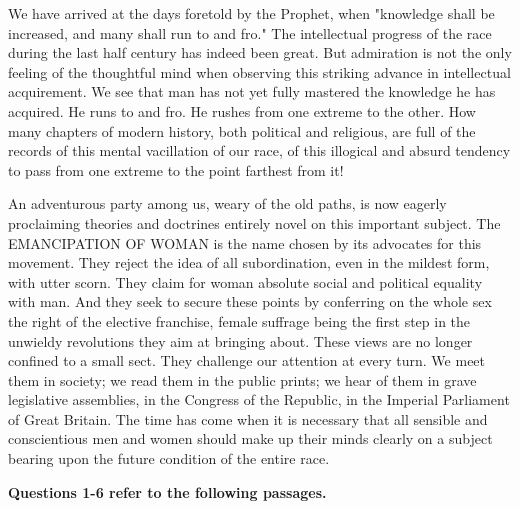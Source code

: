 \begin{linenumbers}
\indent We have arrived at the days foretold by the Prophet, when "knowledge shall be increased, and many shall run to and fro." The intellectual progress of the race during the last half century has indeed been great. But admiration is not the only feeling of the thoughtful mind when observing this striking advance in intellectual acquirement. We see that man has not yet fully mastered the knowledge he has acquired. He runs to and fro. He rushes from one extreme to the other. How many chapters of modern history, both political and religious, are full of the records of this mental vacillation of our race, of this illogical and absurd tendency to pass from one extreme to the point farthest from it!

\indent An adventurous party among us, weary of the old paths, is now eagerly proclaiming theories and doctrines entirely novel on this important subject. The EMANCIPATION OF WOMAN is the name chosen by its advocates for this movement. They reject the idea of all subordination, even in the mildest form, with utter scorn. They claim for woman absolute social and political equality with man. And they seek to secure these points by conferring on the whole sex the right of the elective franchise, female suffrage being the first step in the unwieldy revolutions they aim at bringing about. These views are no longer confined to a small sect. They challenge our attention at every turn. We meet them in society; we read them in the public prints; we hear of them in grave legislative assemblies, in the Congress of the Republic, in the Imperial Parliament of Great Britain. The time has come when it is necessary that all sensible and conscientious men and women should make up their minds clearly on a subject bearing upon the future condition of the entire race.


\end{linenumbers}

\bigskip
\textbf{Questions 1-6 refer to the following passages.}

\begin{linenumbers}
\modulolinenumbers[5]
\indent


\end{linenumbers}


